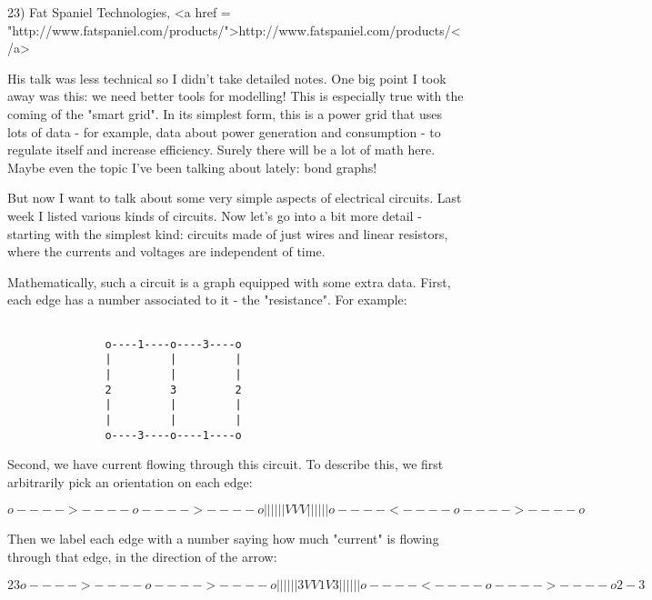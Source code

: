 23) Fat Spaniel Technologies, <a href = "http://www.fatspaniel.com/products/">http://www.fatspaniel.com/products/</a>

His talk was less technical so I didn't take detailed notes.  One big
point I took away was this: we need better tools for modelling!  This
is especially true with the coming of the "smart grid".  In its
simplest form, this is a power grid that uses lots of data - for
example, data about power generation and consumption - to regulate
itself and increase efficiency.  Surely there will be a lot of math
here.  Maybe even the topic I've been talking about lately: bond graphs!

But now I want to talk about some very simple aspects of electrical
circuits.  Last week I listed various kinds of circuits.  Now let's go
into a bit more detail - starting with the simplest kind: circuits
made of just wires and linear resistors, where the currents and
voltages are independent of time.

Mathematically, such a circuit is a graph equipped with some extra
data.  First, each edge has a number associated to it - the
"resistance".  For example:


\begin{verbatim}

               o----1----o----3----o
               |         |         | 
               |         |         | 
               2         3         2 
               |         |         | 
               |         |         | 
               o----3----o----1----o
\end{verbatim}
    
Second, we have current flowing through this circuit.  To describe this,
we first arbitrarily pick an orientation on each edge:


$$

               o---->----o---->----o
               |         |         | 
               |         |         | 
               V         V         V 
               |         |         | 
               |         |         | 
               o----<----o---->----o
 
$$
    
Then we label each edge with a number saying how much "current"
is flowing through that edge, in the direction of the arrow:


$$

                    2        3
               o---->----o---->----o
               |         |         | 
               |         |         | 
             3 V         V 1       V 3
               |         |         | 
               |         |         | 
               o----<----o---->----o
                    2       -3
$$
    
